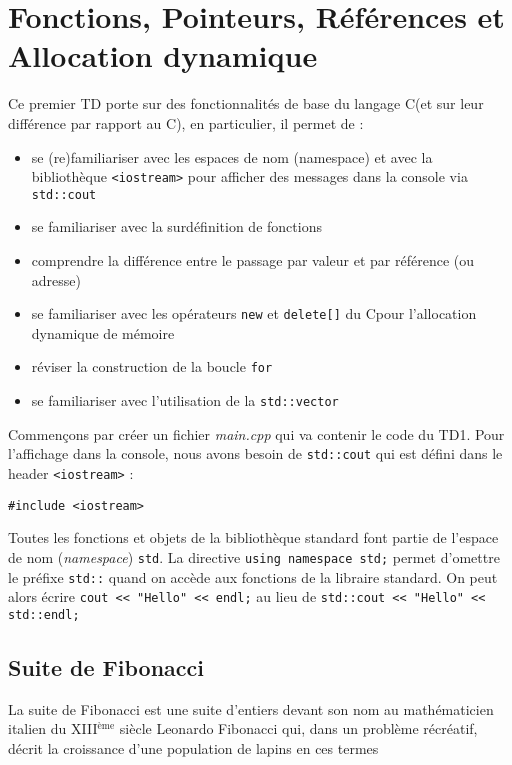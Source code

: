 \documentclass{book}
\newcommand{\inline}[1]{\texttt{#1}}
\newcommand{\cc}{\mbox{C}}
\newcommand{\cpp}{\mbox{C\vspace{.5em}\protect\raisebox{.2ex}{\footnotesize++~}}}
\def\filename{\emph}
\begin{document}
  
\chapter{Fonctions, Pointeurs, Références et Allocation dynamique}


Ce premier TD porte sur des fonctionnalités de base du langage \cpp (et sur leur différence par rapport au \cc), en particulier, il permet de :

\begin{itemize}
  \item se (re)familiariser avec les espaces de nom (namespace) et avec la bibliothèque \inline{<iostream>} pour afficher des messages dans la console via \inline{std::cout} 
  \item se familiariser avec la surdéfinition de fonctions
  \item comprendre la différence entre le passage par valeur et par référence (ou adresse)
  \item se familiariser avec les opérateurs \inline{new} et \inline{delete[]} du \cpp pour l'allocation dynamique de mémoire
  \item réviser la construction de la boucle \inline{for}
  \item se familiariser avec l'utilisation de la \inline{std::vector}
\end{itemize}

\vspace{1em}
Commençons par créer un fichier \filename{main.cpp} qui va contenir le code du TD1. Pour l'affichage dans la console, nous avons besoin de \inline{std::cout} qui est défini dans le header \inline{<iostream>} :
\vspace{-0.5em}
\begin{verbatim}
#include <iostream>
\end{verbatim}
\vspace{-0.5em}
Toutes les fonctions et objets de la bibliothèque standard font partie de l'espace de nom (\emph{namespace}) \inline{std}. La directive \inline{using namespace std;} permet d'omettre le préfixe \inline{std::} quand on accède aux fonctions de la libraire standard. On peut alors écrire \inline{cout << "Hello" << endl;} au lieu de \inline{std::cout << "Hello" << std::endl;}

\section{Suite de Fibonacci}

La suite de Fibonacci est une suite d'entiers devant son nom au mathématicien
italien du XIII\(^{\text{ème}}\) siècle Leonardo Fibonacci qui, dans un problème
récréatif, décrit la croissance d'une population de lapins en ces termes
\end{document}
